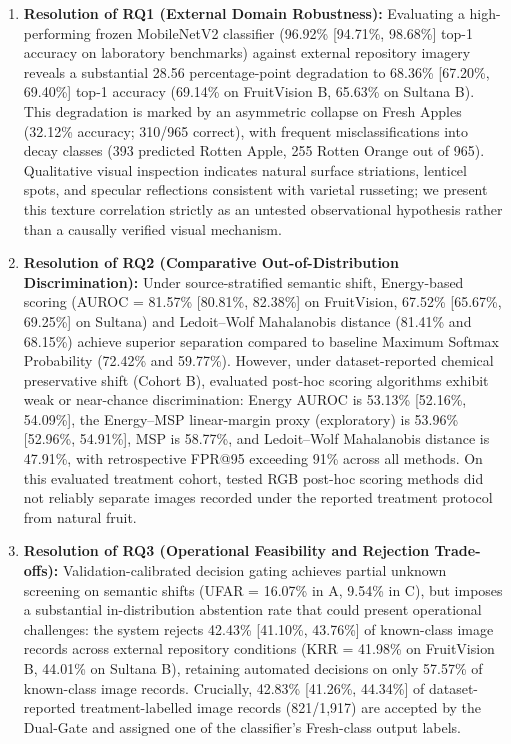 \begin{enumerate}
\setlength{\itemsep}{-2pt}
\setlength{\parsep}{0pt}
\setlength{\parskip}{0pt}
\setlength{\topsep}{0pt}
\setlength{\partopsep}{0pt}
\item \textbf{Resolution of RQ1 (External Domain Robustness):} Evaluating a high-performing frozen MobileNetV2 classifier (96.92\% [94.71\%, 98.68\%] top-1 accuracy on laboratory benchmarks) against external repository imagery reveals a substantial 28.56 percentage-point degradation to 68.36\% [67.20\%, 69.40\%] top-1 accuracy (69.14\% on FruitVision B, 65.63\% on Sultana B). This degradation is marked by an asymmetric collapse on Fresh Apples (32.12\% accuracy; 310/965 correct), with frequent misclassifications into decay classes (393 predicted Rotten Apple, 255 Rotten Orange out of 965). Qualitative visual inspection indicates natural surface striations, lenticel spots, and specular reflections consistent with varietal russeting; we present this texture correlation strictly as an untested observational hypothesis rather than a causally verified visual mechanism.
\item \textbf{Resolution of RQ2 (Comparative Out-of-Distribution Discrimination):} Under source-stratified semantic shift, Energy-based scoring (AUROC = 81.57\% [80.81\%, 82.38\%] on FruitVision, 67.52\% [65.67\%, 69.25\%] on Sultana) and Ledoit--Wolf Mahalanobis distance (81.41\% and 68.15\%) achieve superior separation compared to baseline Maximum Softmax Probability (72.42\% and 59.77\%). However, under dataset-reported chemical preservative shift (Cohort B), evaluated post-hoc scoring algorithms exhibit weak or near-chance discrimination: Energy AUROC is 53.13\% [52.16\%, 54.09\%], the Energy--MSP linear-margin proxy (exploratory) is 53.96\% [52.96\%, 54.91\%], MSP is 58.77\%, and Ledoit--Wolf Mahalanobis distance is 47.91\%, with retrospective FPR@95 exceeding 91\% across all methods. On this evaluated treatment cohort, tested RGB post-hoc scoring methods did not reliably separate images recorded under the reported treatment protocol from natural fruit.
\item \textbf{Resolution of RQ3 (Operational Feasibility and Rejection Trade-offs):} Validation-calibrated decision gating achieves partial unknown screening on semantic shifts (UFAR = 16.07\% in A, 9.54\% in C), but imposes a substantial in-distribution abstention rate that could present operational challenges: the system rejects 42.43\% [41.10\%, 43.76\%] of known-class image records across external repository conditions (KRR = 41.98\% on FruitVision B, 44.01\% on Sultana B), retaining automated decisions on only 57.57\% of known-class image records. Crucially, 42.83\% [41.26\%, 44.34\%] of dataset-reported treatment-labelled image records (821/1,917) are accepted by the Dual-Gate and assigned one of the classifier's Fresh-class output labels.
\end{enumerate}

